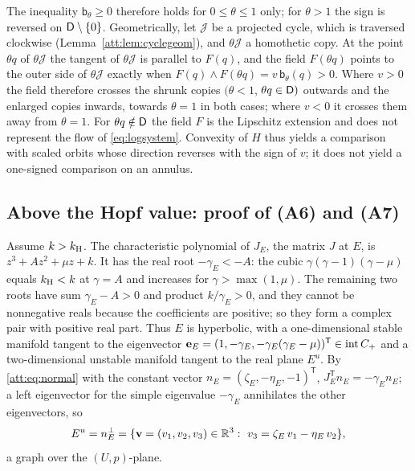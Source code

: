 The inequality $\mathsf b_\theta\ge0$ therefore holds for $0\le\theta\le1$ only; for $\theta>1$ the sign is reversed on $\mathsf D\setminus\{0\}$. Geometrically, let $\mathcal J$ be a projected cycle, which is traversed clockwise (Lemma~\ref{att:lem:cyclegeom}), and $\theta\mathcal J$ a homothetic copy. At the point $\theta q$ of $\theta\mathcal J$ the tangent of $\theta\mathcal J$ is parallel to $F(q)$, and the field $F(\theta q)$ points to the outer side of $\theta\mathcal J$ exactly when $F(q)\wedge F(\theta q)=v\,\mathsf b_\theta(q)>0$. Where $v>0$ the field therefore crosses the shrunk copies $(\theta<1$, $\theta q\in\mathsf D)$ outwards and the enlarged copies inwards, towards $\theta=1$ in both cases; where $v<0$ it crosses them away from $\theta=1$. For $\theta q\notin\mathsf D$ the field $F$ is the Lipschitz extension and does not represent the flow of \eqref{eq:logsystem}. Convexity of $H$ thus yields a comparison with scaled orbits whose direction reverses with the sign of $v$; it does not yield a one-signed comparison on an annulus.

\subsection{Above the Hopf value: proof of (A6) and (A7)}\label{att:sec:above}
Assume $k>k_{\mathrm H}$. The characteristic polynomial of $J_E$, the matrix $J$ at $E$, is $z^3+Az^2+\mu z+k$. It has the real root $-\gamma_E<-A$: the cubic $\gamma(\gamma-1)(\gamma-\mu)$ equals $k_{\mathrm H}<k$ at $\gamma=A$ and increases for $\gamma>\max(1,\mu)$. The remaining two roots have sum $\gamma_E-A>0$ and product $k/\gamma_E>0$, and they cannot be nonnegative reals because the coefficients are positive; so they form a complex pair with positive real part. Thus $E$ is hyperbolic, with a one-dimensional stable manifold tangent to the eigenvector $\mathbf e_E=(1,-\gamma_E,-\gamma_E(\gamma_E-\mu))^{\mathsf T}\in\operatorname{int} C_+$ and a two-dimensional unstable manifold tangent to the real plane $E^u$. By \eqref{att:eq:normal} with the constant vector $n_E=(\zeta_E,-\eta_E,-1)^{\mathsf T}$, $J_E^{\mathsf T}n_E=-\gamma_En_E$; a left eigenvector for the simple eigenvalue $-\gamma_E$ annihilates the other eigenvectors, so
\begin{equation}\label{att:eq:Eu}
E^u=n_E^{\perp}=\{\mathbf v=(v_1,v_2,v_3)\in\R^3:\ v_3=\zeta_E\,v_1-\eta_E\,v_2\},
\end{equation}
a graph over the $(U,p)$-plane.

